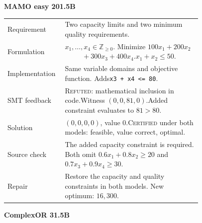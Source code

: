 \begin{figure}[H]
\begin{tcolorbox}[enhanced,colback=verdictlight,colframe=verdictblue,boxrule=0.65pt,arc=1.5mm,left=2mm,right=2mm,top=1.5mm,bottom=1.5mm,boxsep=0pt]
\begin{minipage}[t]{0.485\linewidth}
\vspace{0pt}\small
\textcolor{verdictblue}{\textbf{MAMO easy 20\quad 1.5B}}\par\smallskip
\scriptsize\renewcommand{\arraystretch}{1.12}
\begin{tabular}{@{}P{0.25\linewidth}P{0.67\linewidth}@{}}
\textcolor{verdictblue}{\textsf{Requirement}} & Two capacity limits and two minimum quality requirements.\\
\textcolor{verdictblue}{\textsf{Formulation}} & \(x_1,\ldots,x_4\in\mathbb Z_{\geq0}\). Minimize \(100x_1+200x_2\)\newline\(\phantom{100x_1}+300x_3+400x_4\).\newline\(x_1+x_2\leq50\).\\
\textcolor{caseorange}{\textsf{Implementation}} & Same variable domains and objective function. Adds\newline\texttt{x3 + x4 <= 80}.\\
\textcolor{caseorange}{\textsf{SMT feedback}} & \textcolor{caseorange}{\textsc{Refuted}}: mathematical inclusion in code.\newline Witness \((0,0,81,0)\).\newline Added constraint evaluates to \(81>80\).\\
\textcolor{casegreen}{\textsf{Solution}} & \((0,0,0,0)\), value \(0\).\newline\textcolor{casegreen}{\textsc{Certified}} under both models: feasible, value correct, optimal.\\
\textcolor{verdictblue}{\textsf{Source check}} & The added capacity constraint is required. Both omit \(0.6x_1+0.8x_2\geq20\) and \(0.7x_3+0.9x_4\geq30\).\\
\textcolor{casegreen}{\textsf{Repair}} & Restore the capacity and quality constraints in both models. New optimum: \(16,300\).\\
\end{tabular}
\end{minipage}\hfill
\begin{minipage}[t]{0.485\linewidth}
\vspace{0pt}\small
\textcolor{verdictblue}{\textbf{ComplexOR 3\quad 1.5B}}\par\smallskip

\end{minipage}
\end{tcolorbox}
\end{figure}
